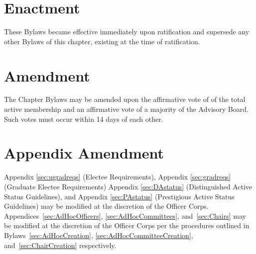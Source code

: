 \section{Enactment} These Bylaws became effective immediately upon ratification and  supersede any other Bylaws of this chapter, existing at the time of ratification.
\section{Amendment} The Chapter Bylaws may be amended upon the affirmative vote of  of the total active membership and an affirmative vote of  a majority of the Advisory Board. Such votes must occur within 14 days of each other.
\section{Appendix Amendment} Appendix \ref{sec:ugradreqs} (Electee Requirements), Appendix \ref{sec:gradreqs} (Graduate Electee Requirements) Appendix \ref{sec:DAstatus} (Distinguished Active Status Guidelines), and Appendix \ref{sec:PAstatus} (Prestigious Active Status Guidelines) may be modified at the discretion of the Officer Corps. Appendices~\ref{sec:AdHocOfficers}, \ref{sec:AdHocCommittees}, and~\ref{sec:Chairs}  may be modified at the discretion of the Officer Corps per the procedures outlined in Bylaws~\ref{sec:AdHocCreation}, \ref{sec:AdHocCommitteeCreation}, and~\ref{sec:ChairCreation} respectively.